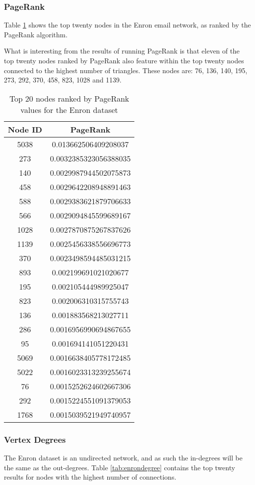 \subsubsection{PageRank}
Table \ref{tab:enronpagerank} shows the top twenty nodes in the Enron email network, as ranked by the PageRank algorithm.

What is interesting from the results of running PageRank is that eleven of the top twenty nodes ranked by PageRank also feature within the top twenty nodes connected to the highest number of triangles. These nodes are: 76, 136, 140, 195, 273, 292, 370, 458, 823, 1028 and 1139.

\begin{table}[htbp]%
\centering
\begin{tabular}{|c|c|}
\hline
Node ID & PageRank \\
\hline
5038 & 0.013662506409208037 \\
273 & 0.0032385323056388035 \\
140 & 0.0029987944502075873 \\
458 & 0.0029642208948891463 \\
588 & 0.0029383621879706633 \\
566 & 0.0029094845599689167 \\
1028 & 0.0027870875267837626 \\
1139 & 0.0025456338556696773 \\
370 & 0.0023498594485031215 \\
893 & 0.002199691021020677 \\
195 & 0.002105444989925047 \\
823 & 0.002006310315755743 \\
136 & 0.001883568213027711 \\
286 & 0.0016956990694867655 \\
95 & 0.001694141051220431 \\
5069 & 0.0016638405778172485 \\
5022 & 0.0016023313239255674 \\
76 & 0.0015252624602667306 \\
292 & 0.0015224551091379053 \\
1768 & 0.0015039521949740957 \\
\hline
\end{tabular}
\caption{Top 20 nodes ranked by PageRank values for the Enron dataset}
\label{tab:enronpagerank}
\end{table}

\subsubsection{Vertex Degrees}
The Enron dataset is an undirected network, and as such the in-degrees will be the same as the out-degrees. Table \ref{tab:enrondegree} contains the top twenty results for nodes with the highest number of connections.

